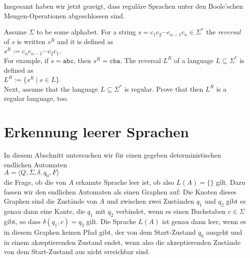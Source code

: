 Insgesamt haben wir jetzt gezeigt, dass regul\"are Sprachen unter den Boole'schen
Mengen-Operationen abgeschlossen sind.

\exerciseEng
Assume $\Sigma$ to be some alphabet.  For a string $s=c_1 c_2 \cdots c_{n-1} c_n \in \Sigma^*$ the \emph{reversal}
of $s$ is written $s^R$ and it is defined as
\\[0.2cm]
\hspace*{1.3cm}
$s^R := c_n c_{n-1} \cdots c_2 c_1$.
\\[0.2cm]
For example, if $s = \mathtt{abc}$, then $s^R = \mathtt{cba}$. The reversal $L^R$ of a language $L \subseteq \Sigma^*$ is defined as
\\[0.2cm]
\hspace*{1.3cm}
$L^R := \{ s^R \mid s \in L \}$.
\\[0.2cm]
Next, assume that the language $L \subseteq \Sigma^*$ is regular.  Prove that then $L^R$ is a regular
language, too. \eox

\section{Erkennung leerer Sprachen \label{section:leer}}
In diesem Abschnitt untersuchen wir f\"ur einen gegeben deterministischen endlichen Automaten
\\[0.2cm]
\hspace*{1.3cm}
$A = \langle Q, \Sigma, \delta, q_0, F \rangle$
\\[0.2cm]
die Frage, ob die von $A$ erkannte Sprache leer ist, ob also $L(A) = \{\}$ gilt.  Dazu fassen wir den
endlichen Automaten als einen Graphen auf: Die
Knoten dieses Graphen sind die Zust\"ande von $A$ und zwischen zwei Zust\"anden $q_1$ und
$q_2$ gibt es genau dann eine Kante, die $q_1$ mit $q_2$ verbindet, wenn es einen
Buchstaben $c \in \Sigma$ gibt, so dass $\delta(q_1, c) = q_2$ gilt.  Die Sprache $L(A)$
ist genau dann leer, wenn es in diesem Graphen keinen Pfad gibt, der von dem Start-Zustand
$q_0$ ausgeht und in einem akzeptierenden Zustand endet, wenn also die akzeptierenden
Zust\"ande von dem Start-Zustand aus nicht erreichbar sind.

